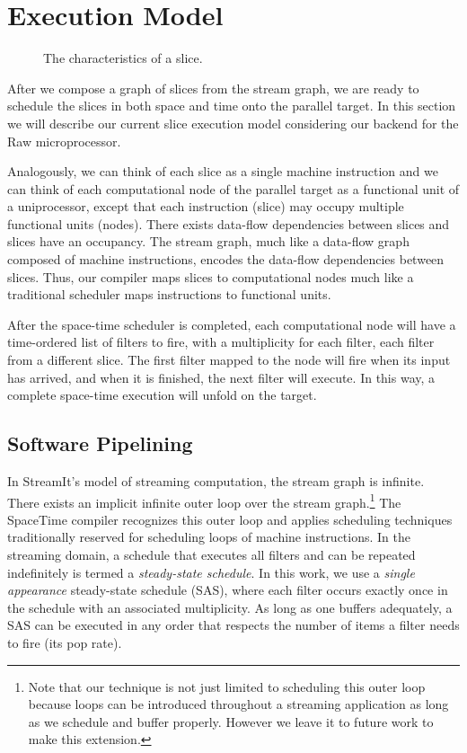 
\section{Execution Model}
\begin{figure}[t]
\centering
{}
\caption{The characteristics of a slice.
\protect\label{fig:slice}}
\end{figure}

After we compose a graph of slices from the stream graph, we are ready
to schedule the slices in both space and time onto the parallel
target.  In this section we will describe our current slice execution
model considering our backend for the Raw microprocessor.

Analogously, we can think of each slice as a single machine
instruction and we can think of each computational node of the
parallel target as a functional unit of a uniprocessor, except that
each instruction (slice) may occupy multiple functional units
(nodes). There exists data-flow dependencies between slices and slices
have an occupancy.  The stream graph, much like a data-flow graph
composed of machine instructions, encodes the data-flow dependencies
between slices. Thus, our compiler maps slices to computational nodes
much like a traditional scheduler maps instructions to functional
units.

After the space-time scheduler is completed, each computational node
will have a time-ordered list of filters to fire, with a multiplicity
for each filter, each filter from a different slice.  The first
filter mapped to the node will fire when its input has arrived, and
when it is finished, the next filter will execute.  In this way, a
complete space-time execution will unfold on the target.

\subsection{Software Pipelining}
\label{sec:softpipe}
In StreamIt's model of streaming computation, the stream graph is
infinite.  There exists an implicit infinite outer loop over the
stream graph.\footnote{Note that our technique is not just limited to
scheduling this outer loop because loops can be introduced throughout
a streaming application as long as we schedule and buffer properly.
However we leave it to future work to make this extension.}  The
SpaceTime compiler recognizes this outer loop and applies scheduling
techniques traditionally reserved for scheduling loops of machine
instructions.  In the streaming domain, a schedule that executes all
filters and can be repeated indefinitely is termed a {\it steady-state
schedule}.  In this work, we use a {\it single appearance}
steady-state schedule (SAS), where each filter occurs exactly once in
the schedule with an associated multiplicity.  As long as one buffers
adequately, a SAS can be executed in any order that respects the
number of items a filter needs to fire (its pop rate).

